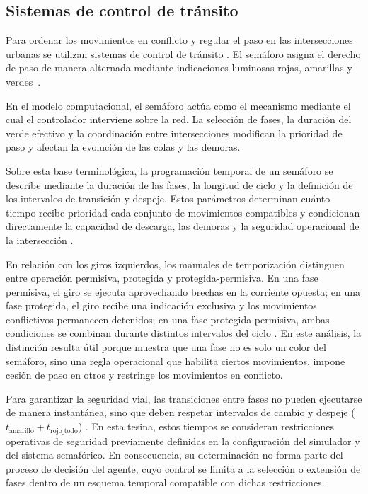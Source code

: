 \subsection{Sistemas de control de tránsito}

Para ordenar los movimientos en conflicto y regular el paso en las intersecciones urbanas se utilizan sistemas de control de tránsito \cite{ite_handbook}. El semáforo asigna el derecho de paso de manera alternada mediante indicaciones luminosas rojas, amarillas y verdes~\cite{calymayor}.

En el modelo computacional, el semáforo actúa como el mecanismo mediante el cual el controlador interviene sobre la red. La selección de fases, la duración del verde efectivo y la coordinación entre intersecciones modifican la prioridad de paso y afectan la evolución de las colas y las demoras.

Sobre esta base terminológica, la programación temporal de un semáforo se describe mediante la duración de las fases, la longitud de ciclo y la definición de los intervalos de transición y despeje. Estos parámetros determinan cuánto tiempo recibe prioridad cada conjunto de movimientos compatibles y condicionan directamente la capacidad de descarga, las demoras y la seguridad operacional de la intersección \cite{ite_handbook}.

En relación con los giros izquierdos, los manuales de temporización distinguen entre operación permisiva, protegida y protegida-permisiva. En una fase permisiva, el giro se ejecuta aprovechando brechas en la corriente opuesta; en una fase protegida, el giro recibe una indicación exclusiva y los movimientos conflictivos permanecen detenidos; en una fase protegida-permisiva, ambas condiciones se combinan durante distintos intervalos del ciclo \cite{fhwa_signal_timing_manual}. En este análisis, la distinción resulta útil porque muestra que una fase no es solo un color del semáforo, sino una regla operacional que habilita ciertos movimientos, impone cesión de paso en otros y restringe los movimientos en conflicto.

Para garantizar la seguridad vial, las transiciones entre fases no pueden ejecutarse de manera instantánea, sino que deben respetar intervalos de cambio y despeje ($t_{\text{amarillo}} + t_{\text{rojo\_todo}}$) \cite{ite_handbook}. En esta tesina, estos tiempos se consideran restricciones operativas de seguridad previamente definidas en la configuración del simulador y del sistema semafórico. En consecuencia, su determinación no forma parte del proceso de decisión del agente, cuyo control se limita a la selección o extensión de fases dentro de un esquema temporal compatible con dichas restricciones.

